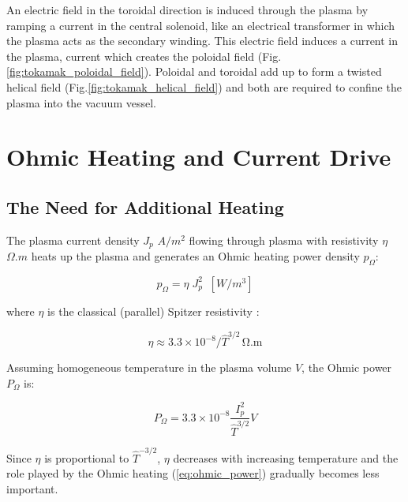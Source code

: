 An electric field in the toroidal direction is induced through the plasma by ramping a current in the central solenoid, like an electrical transformer in which the plasma acts as the secondary winding. This electric field induces a current in the plasma, current which creates the poloidal field (Fig.\ref{fig:tokamak_poloidal_field}). Poloidal and toroidal add up to form a twisted helical field (Fig.\ref{fig:tokamak_helical_field}) and both are required to confine the plasma into the vacuum vessel. 


\section{Ohmic Heating and Current Drive}
\subsection{The Need for Additional Heating}

The plasma current density $J_p$ $\si{A/m^2}$ flowing through plasma with resistivity $\eta$ $\si{\Omega.m}$ heats up the plasma and generates an Ohmic heating power density $p_\Omega$:

\begin{equation}\label{eq:ohmic_power_density}
p_\Omega = \eta \; J_p^2 \;\; \si{[W/m^3]}
\end{equation}

where $\eta$ is the classical (parallel) Spitzer resistivity \cite[Eq.(11.15)]{Freidberg2007}:

\begin{equation}\label{eq:Spitzer_resistivity}
\eta
\approx
3.3 \times 10^{-8} / \hat T^{3/2}  \, \mathrm{\Omega.m}
\end{equation}

Assuming homogeneous temperature in the plasma volume $V$, the Ohmic power $P_\Omega$ is:

\begin{equation}\label{eq:ohmic_power}
P_\Omega
=
3.3 \times 10^{-8} \frac{ I_p^2 }{ \hat T^{3/2} } V
\end{equation}

Since $\eta$ is proportional to $\hat T^{-3/2}$, $\eta$ decreases with increasing temperature and the role played by the Ohmic heating (\ref{eq:ohmic_power}) gradually becomes less important. 

